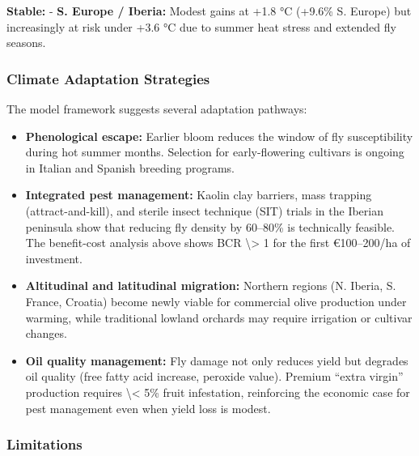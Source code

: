 \textbf{Stable:} - \textbf{S. Europe / Iberia:} Modest gains at +1.8 °C (+9.6\% S. Europe) but increasingly at risk under +3.6 °C due to summer heat stress and extended fly seasons.



\subsubsection{Climate Adaptation Strategies}



\label{5818014557853777175}{}


The model framework suggests several adaptation pathways:



\begin{itemize}
\item[1. ] \textbf{Phenological escape:} Earlier bloom reduces the window of fly  susceptibility during hot summer months. Selection for  early-flowering cultivars is ongoing in Italian and Spanish breeding  programs.


\item[2. ] \textbf{Integrated pest management:} Kaolin clay barriers, mass trapping  (attract-and-kill), and sterile insect technique (SIT) trials in the  Iberian peninsula show that reducing fly density by 60–80\% is  technically feasible. The benefit-cost analysis above shows BCR {\textbackslash}> 1  for the first €100–200/ha of investment.


\item[3. ] \textbf{Altitudinal and latitudinal migration:} Northern regions (N.  Iberia, S. France, Croatia) become newly viable for commercial olive  production under warming, while traditional lowland orchards may  require irrigation or cultivar changes.


\item[4. ] \textbf{Oil quality management:} Fly damage not only reduces yield but  degrades oil quality (free fatty acid increase, peroxide value).  Premium “extra virgin” production requires {\textbackslash}< 5\% fruit infestation,  reinforcing the economic case for pest management even when yield  loss is modest.

\end{itemize}


\subsubsection{Limitations}



